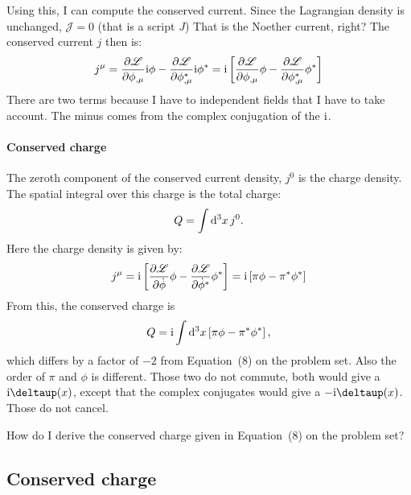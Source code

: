\documentclass[11pt, english, fleqn, DIV=15, headinclude, BCOR=1cm]{scrartcl}
\begin{document}
Using this, I can compute the conserved current. Since the Lagrangian density
is unchanged, $\mathscr J = 0$ (that is a script $J$) That is the Noether
current, right? The conserved current $j$ then is:
\begin{equation}
    j^\mu =
    \frac{\partial {\mathscr L}}{\partial {\phi_{,\mu}}} \mathrm i \phi
    - \frac{\partial {\mathscr L}}{\partial {\phi_{,\mu}^*}} \mathrm i \phi^*
    = \mathrm i
    \left[ 
        \frac{\partial {\mathscr L}}{\partial {\phi_{,\mu}}} \phi
        - \frac{\partial {\mathscr L}}{\partial {\phi_{,\mu}^*}} \phi^*
     \right]
\end{equation}
There are two terms because I have to independent fields that I have to take
account. The minus comes from the complex conjugation of the $\mathrm i$.

\paragraph{Conserved charge}

The zeroth component of the conserved current density, $j^0$ is the charge
density. The spatial integral over this charge is the total charge:
\begin{equation}
    Q = \int \mathop{}\!\mathrm d^3 x \, j^0.
\end{equation}
Here the charge density is given by:
\begin{equation}
    j^\mu
    = \mathrm i
    \left[ 
        \frac{\partial {\mathscr L}}{\partial {\dot\phi}} \phi
        - \frac{\partial {\mathscr L}}{\partial {\dot\phi^*}} \phi^*
     \right]
    = \mathrm i \left[  \pi \phi - \pi^* \phi^*  \right]
\end{equation}
From this, the conserved charge is
\begin{equation}
    \label{eq:mein-Q}
    Q = \mathrm i \int \mathop{}\!\mathrm d^3 x \left[  \pi \phi - \pi^* \phi^*  \right],
\end{equation}
which differs by a factor of $-2$ from Equation~(8) on the problem set. Also
the order of $\pi$ and $\phi$ is different. Those two do not commute, both
would give a $\iup\deltaup(x)$, except that the complex conjugates would give
a $-\iup\deltaup(x)$. Those do not cancel.

\begin{question}
    How do I derive the conserved charge given in Equation~(8) on the problem
    set?
\end{question}

\subsection{Conserved charge}
\end{document}
